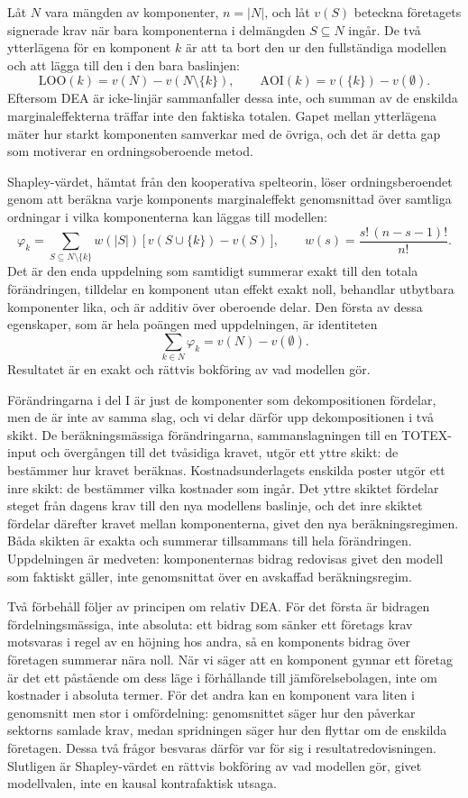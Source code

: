 \documentclass[11pt,a4paper]{article}
\begin{document}
Låt $N$ vara mängden av komponenter, $n = |N|$, och låt $v(S)$ beteckna företagets signerade krav
när bara komponenterna i delmängden $S \subseteq N$ ingår. De två ytterlägena för en komponent $k$
är att ta bort den ur den fullständiga modellen och att lägga till den i den bara baslinjen:
\[
  \mathrm{LOO}(k) = v(N) - v(N \setminus \{k\}), \qquad
  \mathrm{AOI}(k) = v(\{k\}) - v(\emptyset).
\]
Eftersom DEA är icke-linjär sammanfaller dessa inte, och summan av de enskilda marginaleffekterna
träffar inte den faktiska totalen. Gapet mellan ytterlägena mäter hur starkt komponenten samverkar
med de övriga, och det är detta gap som motiverar en ordningsoberoende metod.

Shapley-värdet, hämtat från den kooperativa spelteorin, löser ordningsberoendet genom att beräkna
varje komponents marginaleffekt genomsnittad över samtliga ordningar i vilka komponenterna kan
läggas till modellen:
\[
  \varphi_k = \sum_{S \subseteq N \setminus \{k\}} w(|S|)\,
  \bigl[\, v(S \cup \{k\}) - v(S) \,\bigr], \qquad
  w(s) = \frac{s!\,(n - s - 1)!}{n!}.
\]
Det är den enda uppdelning som samtidigt summerar exakt till den totala förändringen, tilldelar en
komponent utan effekt exakt noll, behandlar utbytbara komponenter lika, och är additiv över
oberoende delar. Den första av dessa egenskaper, som är hela poängen med uppdelningen, är
identiteten
\[
  \sum_{k \in N} \varphi_k = v(N) - v(\emptyset).
\]
Resultatet är en exakt och rättvis bokföring av vad modellen gör.

Förändringarna i del I är just de komponenter som dekompositionen fördelar, men de är inte av samma
slag, och vi delar därför upp dekompositionen i två skikt. De beräkningsmässiga förändringarna,
sammanslagningen till en TOTEX-input och övergången till det tvåsidiga kravet, utgör ett yttre
skikt: de bestämmer hur kravet beräknas. Kostnadsunderlagets enskilda poster utgör ett inre skikt:
de bestämmer vilka kostnader som ingår. Det yttre skiktet fördelar steget från dagens krav till den
nya modellens baslinje, och det inre skiktet fördelar därefter kravet mellan komponenterna, givet
den nya beräkningsregimen. Båda skikten är exakta och summerar tillsammans till hela förändringen.
Uppdelningen är medveten: komponenternas bidrag redovisas givet den modell som faktiskt gäller,
inte genomsnittat över en avskaffad beräkningsregim.

Två förbehåll följer av principen om relativ DEA. För det första är bidragen fördelningsmässiga,
inte absoluta: ett bidrag som sänker ett företags krav motsvaras i regel av en höjning hos andra, så
en komponents bidrag över företagen summerar nära noll. När vi säger att en komponent gynnar ett
företag är det ett påstående om dess läge i förhållande till jämförelsebolagen, inte om kostnader i
absoluta termer. För det andra kan en komponent vara liten i genomsnitt men stor i omfördelning:
genomsnittet säger hur den påverkar sektorns samlade krav, medan spridningen säger hur den flyttar
om de enskilda företagen. Dessa två frågor besvaras därför var för sig i resultatredovisningen.
Slutligen är Shapley-värdet en rättvis bokföring av vad modellen gör, givet modellvalen, inte en
kausal kontrafaktisk utsaga.
\end{document}
